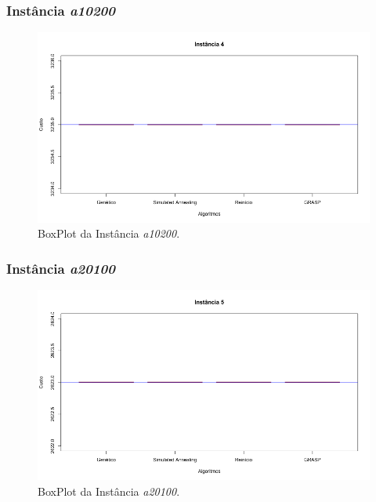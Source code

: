 \documentclass[portugues, brazil, a4paper,12pt]{article}
\begin{document}
		\subsubsection{Instância \textit{a10200}}
			\begin{figure}[H]
				\centering
				\includegraphics[width=1\linewidth]{img/4.png}
				\caption{BoxPlot da Instância \textit{a10200}.}
				\label{fig:a10200}
			\end{figure}
	
		\subsubsection{Instância \textit{a20100}}
			\begin{figure}[H]
				\centering
				\includegraphics[width=1\linewidth]{img/5.png}
				\caption{BoxPlot da Instância \textit{a20100}.}
				\label{fig:a20100}
			\end{figure}
	
\end{document}
